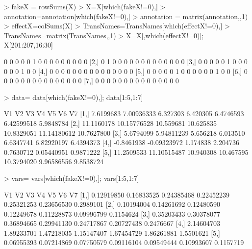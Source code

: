\documentclass[11pt, a4paper, oneside]{article}
\begin{document}
\begin{Schunk}
\begin{Sinput}
> fakeX = rowSums(X)
> X=X[which(fakeX!=0),]
> annotation=annotation[which(fakeX!=0),]
> annotation = matrix(annotation,,1)
> effectX=colSums(X)
> TransNames=TransNames[which(effectX!=0),]
> TransNames=matrix(TransNames,,1)
> X=X[,which(effectX!=0)]; X[201:207,16:30]
\end{Sinput}
\begin{Soutput}
     [,1] [,2] [,3] [,4] [,5] [,6] [,7] [,8] [,9] [,10] [,11] [,12] [,13] [,14] [,15]
[1,]    0    0    0    0    0    1    0    0    0     0     0     0     0     0     0
[2,]    0    1    0    0    0    0    0    0    0     0     0     0     0     0     0
[3,]    0    0    0    0    0    1    0    0    0     0     0     0     1     0     0
[4,]    0    0    0    0    0    0    0    0    0     0     0     0     0     0     0
[5,]    0    0    0    0    0    1    0    0    0     0     0     0     1     0     0
[6,]    0    0    0    0    0    0    0    0    0     0     0     0     0     0     0
[7,]    0    0    0    0    0    0    0    0    0     0     0     0     0     0     0
\end{Soutput}
\begin{Sinput}
> data= data[which(fakeX!=0),]; data[1:5,1:7]
\end{Sinput}
\begin{Soutput}
             V1          V2        V3        V4         V5          V6         V7
[1,]  7.6199683  7.00936333  6.327303  6.420305  6.4746593  6.42599518  5.9848784
[2,] 11.1160178 10.15776528 10.559681 10.625835 10.8329051 11.14180612 10.7627800
[3,]  5.6794099  5.94811239  5.656218  6.013510  6.6347741  6.82920197  6.4394373
[4,] -0.8461938 -0.09323972  1.174838  2.204736  0.7630712  0.05440951  0.9871222
[5,] 11.2509533 11.10515487 10.940308 10.467595 10.3794020  9.96586556  9.8538724
\end{Soutput}
\begin{Sinput}
> vars= vars[which(fakeX!=0),]; vars[1:5,1:7]
\end{Sinput}
\begin{Soutput}
             V1         V2         V3         V4         V5         V6        V7
[1,] 0.12919850 0.16833525 0.24385468 0.22452239 0.25321253 0.23656530 0.2989101
[2,] 0.10194004 0.14261692 0.12480590 0.12249678 0.11228873 0.09996799 0.1154624
[3,] 0.35203433 0.30378077 0.36894665 0.29941130 0.24717867 0.20727438 0.2476667
[4,] 2.14604703 1.89233701 1.47218035 1.15147407 1.67454729 1.86261881 1.5501621
[5,] 0.06955393 0.07214869 0.07750579 0.09116104 0.09549444 0.10993607 0.1157719
\end{Soutput}
\end{Schunk}
\end{document}
